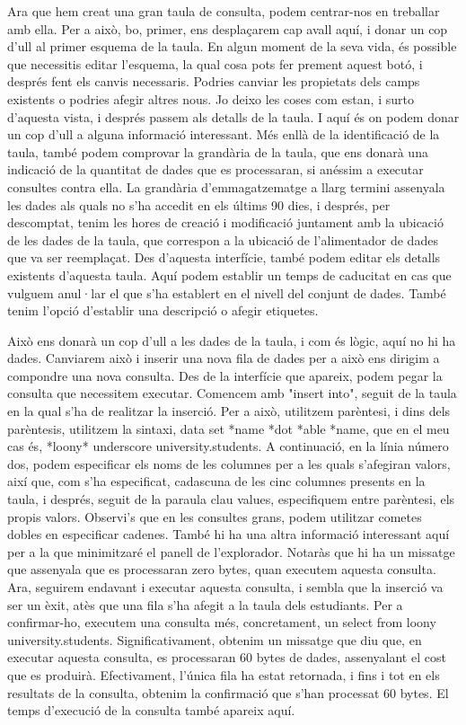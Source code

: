 \documentclass[12pt,longbibliography]{article}
\theoremstyle{definition}
\theoremstyle{remark}
\begin{document}
Ara que hem creat una gran taula de consulta, podem centrar-nos en treballar amb ella. Per a això, bo, primer, ens desplaçarem cap avall aquí, i donar un cop d'ull al primer esquema de la taula. En algun moment de la seva vida, és possible que necessitis editar l'esquema, la qual cosa pots fer prement aquest botó, i després fent els canvis necessaris. Podries canviar les propietats dels camps existents o podries afegir altres nous. Jo deixo les coses com estan, i surto d'aquesta vista, i després passem als detalls de la taula. I aquí és on podem donar un cop d'ull a alguna informació interessant. Més enllà de la identificació de la taula, també podem comprovar la grandària de la taula, que ens donarà una indicació de la quantitat de dades que es processaran, si anéssim a executar consultes contra ella. La grandària d'emmagatzematge a llarg termini assenyala les dades als quals no s'ha accedit en els últims 90 dies, i després, per descomptat, tenim les hores de creació i modificació juntament amb la ubicació de les dades de la taula, que correspon a la ubicació de l'alimentador de dades que va ser reemplaçat. Des d'aquesta interfície, també podem editar els detalls existents d'aquesta taula. Aquí podem establir un temps de caducitat en cas que vulguem anul·lar el que s'ha establert en el nivell del conjunt de dades. També tenim l'opció d'establir una descripció o afegir etiquetes.

Això ens donarà un cop d'ull a les dades de la taula, i com és lògic, aquí no hi ha dades. Canviarem això i inserir una nova fila de dades per a això ens dirigim a compondre una nova consulta. Des de la interfície que apareix, podem pegar la consulta que necessitem executar. Comencem amb "insert into", seguit de la taula en la qual s'ha de realitzar la inserció. Per a això, utilitzem parèntesi, i dins dels parèntesis, utilitzem la sintaxi, data set *name *dot *able *name, que en el meu cas és, *loony* underscore university.students. A continuació, en la línia número dos, podem especificar els noms de les columnes per a les quals s'afegiran valors, així que, com s'ha especificat, cadascuna de les cinc columnes presents en la taula, i després, seguit de la paraula clau values, especifiquem entre parèntesi, els propis valors. Observi's que en les consultes grans, podem utilitzar cometes dobles en especificar cadenes. També hi ha una altra informació interessant aquí per a la que minimitzaré el panell de l'explorador. Notaràs que hi ha un missatge que assenyala que es processaran zero bytes, quan executem aquesta consulta. Ara, seguirem endavant i executar aquesta consulta, i sembla que la inserció va ser un èxit, atès que una fila s'ha afegit a la taula dels estudiants. Per a confirmar-ho, executem una consulta més, concretament, un select from loony university.students. Significativament, obtenim un missatge que diu que, en executar aquesta consulta, es processaran 60 bytes de dades, assenyalant el cost que es produirà. Efectivament, l'única fila ha estat retornada, i fins i tot en els resultats de la consulta, obtenim la confirmació que s'han processat 60 bytes. El temps d'execució de la consulta també apareix aquí.
\end{document}
